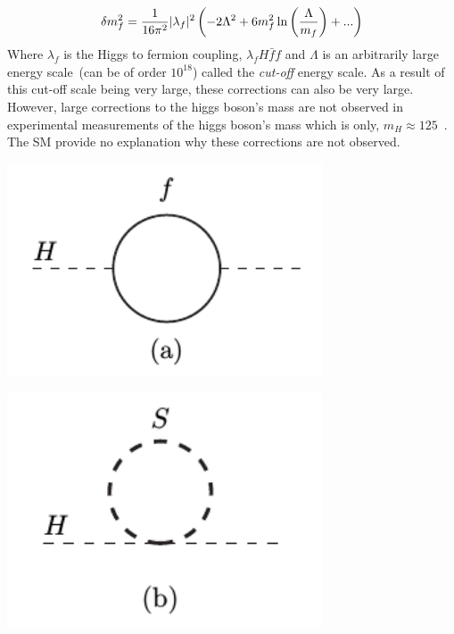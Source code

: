 \begin{equation}{\label{eq:HFermion}}
\delta m^{2}_{f} = \frac{1}{16\pi^{2}}|\lambda_{f}|^{2}\left(-2\Lambda^{2} + 6m^{2}_{f}\ln\left(\frac{\Lambda}{m_{f}}\right) + ...\right) 
\end{equation}
Where $\lambda_{f}$ is the Higgs to fermion coupling, $\lambda_{f}H\bar{f}f$ and $\Lambda$ is an arbitrarily large energy scale~(can be of order $10^{18}$\GeV) called the \textit{cut-off} energy scale. 
 As a result of this cut-off scale being very large, these corrections can also be very large.
However, large corrections to the higgs boson's mass are not observed in experimental measurements of the higgs boson's mass which is only, $m_{H} \approx 125$~\GeVcc.
The SM provide no explanation why these corrections are not observed.
\begin{center}
\begin{minipage}[b]{0.45\linewidth}
\centering
\includegraphics[width=0.70\textwidth]{THESISPLOTS/Higgs_MassFermion.png}
\end{minipage}
\hspace{0.5cm}
\begin{minipage}[b]{0.45\linewidth}
\centering
\includegraphics[width=0.70\textwidth]{THESISPLOTS/Higgs_MassScalar.png}
\end{minipage}
\label{fig:HM}
\end{center}
